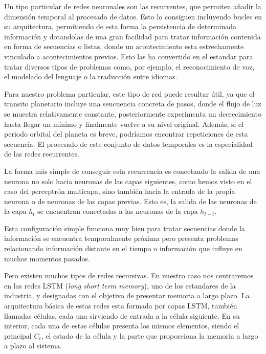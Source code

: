 Un tipo particular de redes neuronales son las recurrentes, que permiten añadir la dimensión temporal al procesado de datos. Esto lo consiguen incluyendo bucles en su arquitectura, permitiendo de esta forma la persistencia de determinada información y dotandolas de una gran facilidad para tratar información contenida en forma de secuencias o listas, donde un acontecimiento esta estrechamente vinculado a acontecimientos previos. Esto las ha convertido en el estandar para tratar diversos tipos de problemas como, por ejemplo, el reconocimiento de voz, el modelado del lenguaje o la traducción entre idiomas.

Para nuestro problema particular, este tipo de red puede resultar útil, ya que el transito planetario incluye una sencuencia concreta de pasos, donde el flujo de luz se muestra relativamente constante, posteriormente experimenta un decrecimiento hasta llegar un mínimo y finalmente vuelve a su nivel original. Además, si el periodo orbital del planeta es breve, podríamos encontrar repeticiones de esta secuencia. El procesado de este conjunto de datos temporales es la especialidad de las redes recurrentes.


La forma más simple de conseguir esta recurrencia es conectando la salida de una neurona no solo hacia neuronas de las capas siguientes, como hemos visto en el caso del perceptrón multicapa, sino también hacia la entrada de la propia neurona o de neuronas de las capas previas. Esto es, la salida de las neuronas de la capa $h_t$ se encuentran conectadas a las neuronas de la capa $h_{t-i}$. 

Esta configuración simple funciona muy bien para tratar secuencias donde la información se encuentra temporalmente próxima pero presenta problemas relacionando información distante en el tiempo o información que influye en muchos momentos pasados.

Pero existen muchos tipos de redes recursivas. En nuestro caso nos centraremos en las redes LSTM (\textit{long short term memory}), uno de los estandares de la industria, y designadas con el objetivo de presentar memoria a largo plazo. La arquitectura básica de estas redes esta formada por capas LSTM, también llamadas células, cada una sirviendo de entrada a la célula siguiente. En su interior, cada una de estas células presenta los mismos elementos, siendo el principal $C_t$, el estado de la célula y la parte que proporciona la memoria a largo a plazo al sistema.

